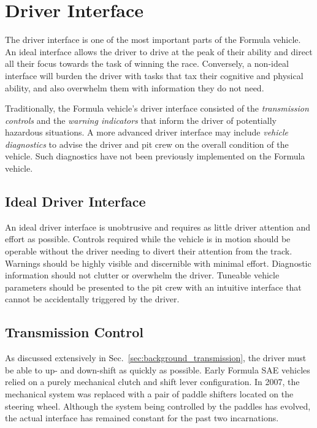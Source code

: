 \section{Driver Interface}

The driver interface is one of the most important parts of the Formula vehicle. An ideal interface allows the driver to drive at the peak of their ability and direct all their focus towards the task of winning the race. Conversely, a non-ideal interface will burden the driver with tasks that tax their cognitive and physical ability, and also overwhelm them with information they do not need.

Traditionally, the Formula vehicle's driver interface consisted of the \emph{transmission controls} and the \emph{warning indicators} that inform the driver of potentially hazardous situations. A more advanced driver interface may include \emph{vehicle diagnostics} to advise the driver and pit crew on the overall condition of the vehicle. Such diagnostics have not been previously implemented on the Formula vehicle.

\subsection{Ideal Driver Interface}

An ideal driver interface is unobtrusive and requires as little driver attention and effort as possible. Controls required while the vehicle is in motion should be operable without the driver needing to divert their attention from the track. Warnings should be highly visible and discernible with minimal effort. Diagnostic information should not clutter or overwhelm the driver. Tuneable vehicle parameters should be presented to the pit crew with an intuitive interface that cannot be accidentally triggered by the driver.

\subsection{Transmission Control}

As discussed extensively in Sec.\ \ref{sec:background_transmission}, the driver must be able to up- and down-shift as quickly as possible. Early Formula SAE vehicles relied on a purely mechanical clutch and shift lever configuration. In 2007, the mechanical system was replaced with a pair of paddle shifters located on the steering wheel. Although the system being controlled by the paddles has evolved, the actual interface has remained constant for the past two incarnations.

